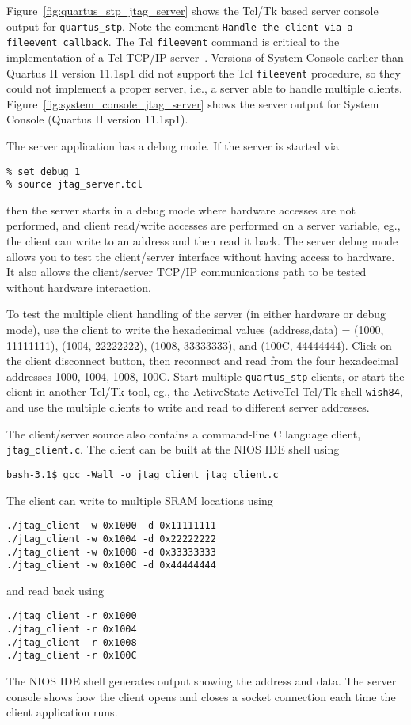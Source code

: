 \documentclass[10pt,twoside]{article}
\begin{document}
Figure~\ref{fig:quartus_stp_jtag_server} shows the Tcl/Tk based
server console output for \verb+quartus_stp+. Note the comment
{\tt Handle the client via a fileevent callback}. The Tcl
\verb+fileevent+ command is critical to the implementation
of a Tcl TCP/IP server~\cite{Welch_2000}.
Versions of System Console earlier than Quartus II version 11.1sp1
did not support the Tcl \verb+fileevent+ procedure, so they could
not implement a proper server, i.e., a server able to handle
multiple clients. Figure~\ref{fig:system_console_jtag_server}
shows the server output for System Console
(Quartus II version 11.1sp1).

The server application has a debug mode. If the server is started
via
%
\begin{verbatim}
% set debug 1
% source jtag_server.tcl
\end{verbatim}
%
then the server starts in a debug mode where hardware accesses
are not performed, and client read/write accesses are
performed on a server variable, eg., the client can write
to an address and then read it back. The server debug mode
allows you to test the client/server interface without having
access to hardware. It also allows the client/server TCP/IP 
communications path to be tested without hardware interaction.

To test the multiple client handling of the server (in either
hardware or debug mode), use the client to write the hexadecimal values
(address,data) =  (1000, 11111111), (1004, 22222222), (1008, 33333333),
and (100C, 44444444). Click on the client disconnect button,
then reconnect and read from the four hexadecimal addresses
1000, 1004, 1008, 100C. Start multiple \verb+quartus_stp+ clients, or
start the client in another Tcl/Tk tool, eg., the 
\href{http://www.activestate.com/activetcl}
{ActiveState ActiveTcl} Tcl/Tk shell \verb+wish84+, and use the
multiple clients to write and read to different server addresses. 

The client/server source also contains a command-line C language
client, \verb+jtag_client.c+. The client can be built at the
NIOS IDE shell using
%
\begin{verbatim}
bash-3.1$ gcc -Wall -o jtag_client jtag_client.c
\end{verbatim}
%
The client can write to multiple SRAM locations using
%
\begin{verbatim}
./jtag_client -w 0x1000 -d 0x11111111
./jtag_client -w 0x1004 -d 0x22222222
./jtag_client -w 0x1008 -d 0x33333333
./jtag_client -w 0x100C -d 0x44444444
\end{verbatim}
%
and read back using
%
\begin{verbatim}
./jtag_client -r 0x1000
./jtag_client -r 0x1004
./jtag_client -r 0x1008
./jtag_client -r 0x100C
\end{verbatim}
%
The NIOS IDE shell generates output showing the address and data.
The server console shows how the client opens and closes a
socket connection each time the client application runs.
\end{document}
